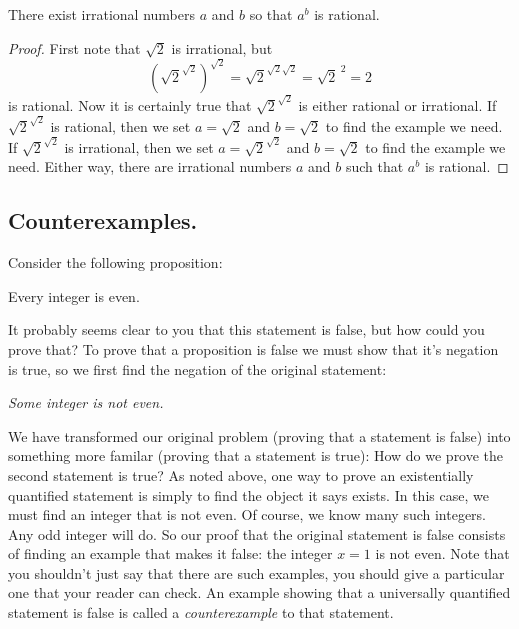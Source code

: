\begin{thrm}
There exist irrational numbers $a$ and $b$ so that $a^b$ is rational.
\end{thrm}

\begin{proof}
First note that $\sqrt 2$ is irrational, but \[\left({\sqrt 2}^{\sqrt 2}\right)^{\sqrt 2}=\sqrt 2^{\sqrt 2 \sqrt 2}=\sqrt 2^{\ 2}=2\] is rational. Now it is certainly true that $\sqrt 2^{\sqrt 2}$ is either rational or irrational. If $\sqrt 2^{\sqrt 2}$ is rational, then we set $a=\sqrt 2$ and $b=\sqrt 2$ to find the example we need. If $\sqrt 2^{\sqrt 2}$ is irrational, then we set $a=\sqrt 2^{\sqrt 2}$ and $b=\sqrt 2$ to find the example we need. Either way, there are irrational numbers $a$ and $b$ such that $a^b$ is rational.
\end{proof}

\subsection{Counterexamples.} 
Consider the following proposition:

\begin{falsethrm}
Every integer is even.
\end{falsethrm}

It probably seems clear to you that this statement is false, but how could you prove that?  To prove that a proposition is false we must show that it's negation is true, so we first find the negation of the original statement:

\begin{center} {\sl Some integer is not even.} \end{center}

We have transformed our original problem (proving that a statement is false) into something more familar (proving that a statement is true): How do we prove the second statement is true? As noted above, one way to prove an existentially quantified statement is simply to find the object it says exists.  In this case, we must find an integer that is not even.  Of course, we know many such integers.  Any odd integer will do.  So our proof that the original statement is false consists of finding an example that makes it false: the integer $x=1$ is not even.  Note that you shouldn't just say that there are such examples, you should give a particular one that your reader can check. An example showing that a universally quantified statement is false is called a \emph{counterexample} to that statement.

